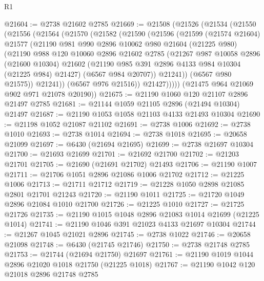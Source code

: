 \begin{lexlean}{R1}
\begin{coremodule}
@21604 := @2738 @21602 @2785
@21669 := @21508
    (@21526
      (@21534
        (@21550
          (@21556
            (@21564
              (@21570
                (@21582
                  (@21590
                    (@21596
                      (@21599
                        (@21574 @21604)
                        @21577
                        (@21190
                          @981
                          @990
                          @2896
                          @10062
                          @980
                          @21604
                          (@21225 @980)
                          (@21190
                            @988
                            @120
                            @10060
                            @2896
                            @21602
                            @2785
                            (@21267
                              @987
                              @10058
                              @2896
                              (@21600 @10304)
                              @21602
                              (@21190 @985 @391 @2896 @4133 @984 @10304 (@21225 @984) @21427)
                              (@6567 @984 @20707))
                            @21241))
                        (@6567 @980 @21575))
                      @21241))
                  (@6567 @976 @21516))
                @21427)))))
      (@21475 @964 @21069 @902 @971 @21078 @20190))
@21675 := @21190 @1060 @120 @21107 @2896 @21497 @2785
@21681 := @21144 @1059 @21105 @2896 (@21494 @10304) @21497
@21687 := @21190 @1053 @1058 @21103 @4133 @21493 @10304
@21690 := @21198 @1052 @21087 @21102
@21691 := @2738 @1006
@21692 := @2738 @1010
@21693 := @2738 @1014
@21694 := @2738 @1018
@21695 := @20658 @21099
@21697 := @6430 (@21694 @21695)
@21699 := @2738 @21697 @10304
@21700 := @21693 @21699
@21701 := @21692 @21700
@21702 := @21203 @21701
@21705 := @21690 (@21691 @21702) @21493
@21706 := @21190 @1007
@21711 := @21706 @1051 @2896 @21086 @1006 @21702
@21712 := @21225 @1006
@21713 := @21711 @21712
@21719 := @21228 @1050 @2898 @21085 @2801 @21701 @21243
@21720 := @21190 @1011
@21725 := @21720 @1049 @2896 @21084 @1010 @21700
@21726 := @21225 @1010
@21727 := @21725 @21726
@21735 := @21190 @1015 @1048 @2896 @21083 @1014 @21699 (@21225 @1014)
@21741 := @21190 @1046 @391 @21023 @4133 @21697 @10304
@21744 := @21267 @1045 @21021 @2896
@21745 := @2738 @1022
@21746 := @20658 @21098
@21748 := @6430 (@21745 @21746)
@21750 := @2738 @21748 @2785
@21753 := @21744 (@21694 @21750) @21697
@21761 := @21190 @1019 @1044 @2896 @21020 @1018 @21750 (@21225 @1018)
@21767 := @21190 @1042 @120 @21018 @2896 @21748 @2785

\end{coremodule}
\end{lexlean}
